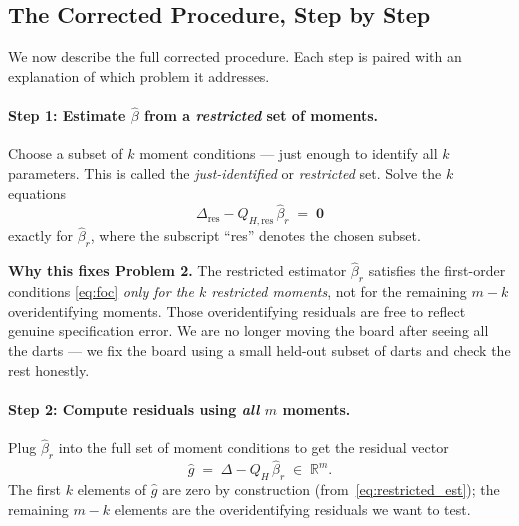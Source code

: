 \subsection{The Corrected Procedure, Step by Step}
\label{subsec:procedure}

We now describe the full corrected procedure.  Each step is paired with
an explanation of which problem it addresses.

\paragraph{Step 1: Estimate $\hat\beta$ from a \emph{restricted} set of
moments.}

Choose a subset of $k$ moment conditions --- just enough to identify
all $k$ parameters.  This is called the \emph{just-identified} or
\emph{restricted} set.  Solve the $k$ equations
\begin{equation}
  \Delta_{\text{res}} - Q_{H,\text{res}}\,\hat\beta_r \;=\; \mathbf{0}
  \label{eq:restricted_est}
\end{equation}
exactly for $\hat\beta_r$, where the subscript ``res'' denotes the
chosen subset.

\medskip
\noindent\textbf{Why this fixes Problem 2.}  The restricted estimator
$\hat\beta_r$ satisfies the first-order conditions
\eqref{eq:foc} \emph{only for the $k$ restricted moments}, not for the
remaining $m - k$ overidentifying moments.  Those overidentifying
residuals are free to reflect genuine specification error.  We are no
longer moving the board after seeing all the darts --- we fix the board
using a small held-out subset of darts and check the rest honestly.

\paragraph{Step 2: Compute residuals using \emph{all} $m$ moments.}

Plug $\hat\beta_r$ into the full set of moment conditions to get the
residual vector
\begin{equation}
  \hat g \;=\; \Delta - Q_H\,\hat\beta_r \;\in\; \mathbb{R}^m.
  \label{eq:residuals}
\end{equation}
The first $k$ elements of $\hat g$ are zero by construction
(from~\eqref{eq:restricted_est}); the remaining $m - k$ elements
are the overidentifying residuals we want to test.

